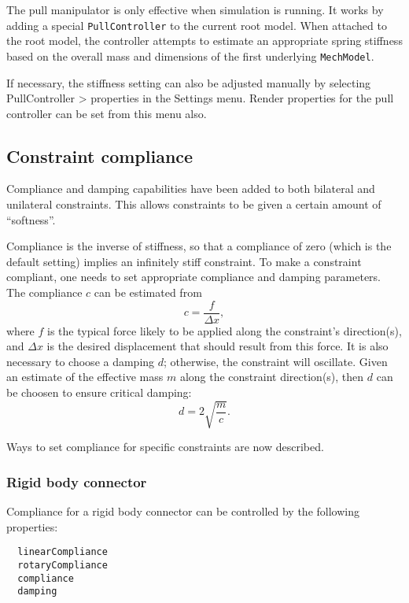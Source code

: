 \documentclass{article}
\begin{document}
The pull manipulator is only effective when simulation is running.  It
works by adding a special {\tt PullController} to the current root
model. When attached to the root model, the controller attempts to
estimate an appropriate spring stiffness based on the overall mass and
dimensions of the first underlying {\tt MechModel}.

If necessary, the stiffness setting can also be adjusted manually by
selecting {\sf PullController > properties} in the {\sf Settings}
menu.  Render properties for the pull controller can be set from this
menu also.

\subsection*{Constraint compliance}

Compliance and damping capabilities have been added to both bilateral
and unilateral constraints. This allows constraints to be
given a certain amount of ``softness''.

Compliance is the inverse of stiffness, so that a compliance of zero
(which is the default setting) implies an infinitely stiff constraint.
To make a constraint compliant, one needs to set appropriate
compliance and damping parameters. The compliance $c$ can
be estimated from
\[
c = \frac{f}{\Delta x},
\]
where $f$ is the typical force likely to be applied along the
constraint's direction(s), and $\Delta x$ is the desired displacement
that should result from this force. It is also necessary to choose a
damping $d$; otherwise, the constraint will oscillate. Given an
estimate of the effective mass $m$ along the constraint direction(s),
then $d$ can be choosen to ensure critical damping:
\[
d = 2 \sqrt{\frac{m}{c}}.
\]

Ways to set compliance for specific constraints are now described.

\subsubsection*{Rigid body connector}

Compliance for a rigid body connector can be controlled by the
following properties:

\begin{lstlisting}
  linearCompliance
  rotaryCompliance
  compliance
  damping
\end{lstlisting}
\end{document}
